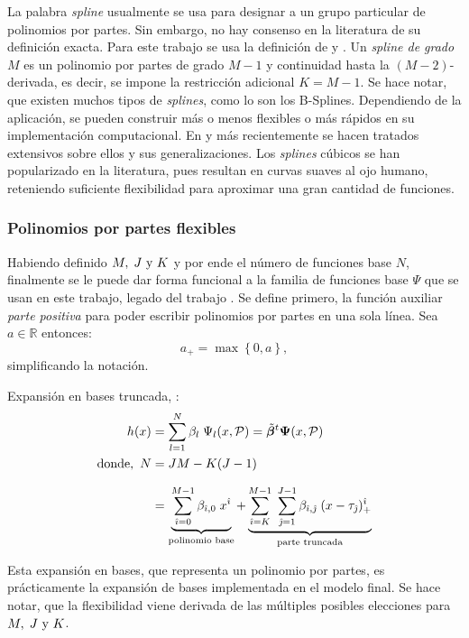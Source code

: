 \documentclass[../Main/Main.tex]{subfiles}
\begin{document}
La palabra \textit{spline} usualmente se usa para designar a un grupo particular de polinomios por partes. Sin embargo, no hay consenso en la literatura de su definición exacta. Para este trabajo se usa la definición de \citet{wasserman2007all} y \citet{hastie2008elements}.  Un \textit{spline de grado $M$} es un polinomio por partes de grado $M-1$ y continuidad hasta la $(M-2)$-derivada, es decir, se impone la restricción adicional $K = M - 1$. Se hace notar, que existen muchos tipos de \textit{splines}, como lo son los B-Splines. Dependiendo de la aplicación, se pueden construir más o menos flexibles o más rápidos en su implementación computacional. En \citet{deboor1978splines} y más recientemente \citet{wahba1990splines} se hacen tratados extensivos sobre ellos y sus generalizaciones. Los \textit{splines} cúbicos se han popularizado en la literatura, pues resultan en curvas suaves al ojo humano, reteniendo suficiente flexibilidad para aproximar una gran cantidad de funciones.

\subsubsection*{Polinomios por partes flexibles} 
Habiendo definido $M,\;J\text{ y }K$ y por ende el número de funciones base $N$, finalmente se le puede dar forma funcional a la familia de funciones base $\Psi$ que se usan en este trabajo, legado del trabajo \citet{mallik1998automatic}. Se define primero, la función auxiliar \textit{parte positiva} para poder escribir polinomios por partes en una sola línea. Sea $a \in \mathbb{R}$ entonces:
$$ a_+ = \max\left\{0,a\right\},$$
simplificando la notación. \\

\begin{definition} Expansión en bases truncada, \citet{mallik1998automatic}:
\begin{align}
	h(x) &= \sum_{l = 1}^{N} \beta_l \; \Psi_l(x,\mathcal{P}) = \tilde{\bm{\beta}}^t\bm{\Psi}(x,\mathcal{P})\label{ec:ExpBase_NEstrella} \\ 
	\text{donde, } \, N &= JM - K(J-1) \nonumber \\[7pt]
 		 &=	\underbrace{
	        \sum_{\hat{\imath} = 0}^{M - 1} \beta_{\hat{\imath},0} \; x^{\hat{\imath}}
 		    }_\text{polinomio base} + 
			\underbrace{
			\sum_{\hat{\imath} = K}^{M-1} \;
	 		\sum_{\hat{\jmath} = 1}^{J-1}\beta_{\hat{\imath},\hat{\jmath}}\;(x - \tau_{\hat{\jmath}})_+^{\hat{\imath}}
	 		}_\text{parte truncada}
	 			\label{ec:PoliMallik}
\end{align}
\end{definition}
Esta expansión en bases, que representa un polinomio por partes, es prácticamente la expansión de bases implementada en el modelo final. Se hace notar, que la flexibilidad viene derivada de las múltiples posibles elecciones para $M,\;J\text{ y }K$.
\end{document}
